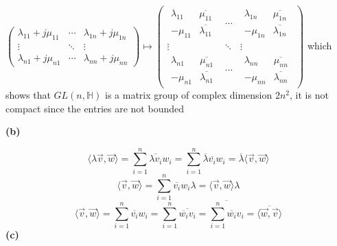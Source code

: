 \documentclass[main]{subfiles}
\newcommand{\<}[1]{\langle #1 \rangle}
\begin{document}
$\left( {\begin{array}{ccc}
\lambda_{11}+j\mu_{11} &\cdots & \lambda_{1n}+j\mu_{1n}  \\
\vdots & \ddots & \vdots \\
 \lambda_{n1}+j\mu_{n1} &\cdots & \lambda_{nn}+j\mu_{nn}
\end{array} } \right)\mapsto\left( {\begin{array}{ccc}
\begin{array}{cc}\lambda_{11} & \overline{\mu_{11}} \\-\mu_{11} & \overline{\lambda_{11}}\end{array} &\cdots & \begin{array}{cc}\lambda_{1n} & \overline{\mu_{1n}} \\-\mu_{1n} & \overline{\lambda_{1n}}\end{array}   \\
\vdots & \ddots & \vdots \\
\begin{array}{cc}\lambda_{n1} & \overline{\mu_{n1}} \\-\mu_{n1} & \overline{\lambda_{n1}}\end{array}&\cdots &\begin{array}{cc}\lambda_{nn} & \overline{\mu_{nn}} \\-\mu_{nn} & \overline{\lambda_{nn}}\end{array}
\end{array} } \right)$ which shows that $GL(n,\mathbb H)$ is a matrix group of complex dimension $2n^2$, it is not compact since the entries are not bounded \par
\textbf{(b)} \par
$$\<{\lambda\vec{v},\vec{w}}=\sum_{i=1}^n\overline{\lambda v_i}w_i=\sum_{i=1}^n \overline\lambda\overline{v_i} w_i=\overline\lambda\<{\vec{v},\vec{w}}$$
$$\<{\vec{v},\vec{w}}=\sum_{i=1}^n\overline{v_i}w_i\lambda=\<{\vec{v},\vec{w}}\lambda$$
$$\<{\vec{v},\vec{w}}=\sum_{i=1}^n\overline{v_i}w_i=\sum_{i=1}^n \overline{\overline{w_i} v_i}=\overline{\sum_{i=1}^n\overline{w_i} v_i}=\overline{\<{\vec{w},\vec{v}}}$$
\textbf{(c)} \par
\end{document}
